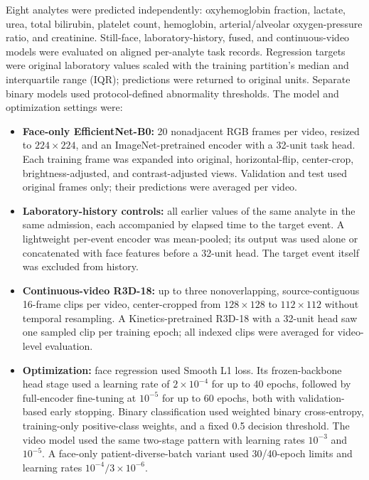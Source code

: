 \documentclass[10pt,a4paper]{article}
\begin{document}
Eight analytes were predicted independently: oxyhemoglobin fraction, lactate, urea, total bilirubin, platelet count, hemoglobin, arterial/alveolar oxygen-pressure ratio, and creatinine. Still-face, laboratory-history, fused, and continuous-video models were evaluated on aligned per-analyte task records. Regression targets were original laboratory values scaled with the training partition's median and interquartile range (IQR); predictions were returned to original units. Separate binary models used protocol-defined abnormality thresholds. The model and optimization settings were:
\begin{itemize}
\setlength{\itemsep}{1pt}
\item \textbf{Face-only EfficientNet-B0:} 20 nonadjacent RGB frames per video, resized to $224\times224$, and an ImageNet-pretrained encoder with a 32-unit task head. Each training frame was expanded into original, horizontal-flip, center-crop, brightness-adjusted, and contrast-adjusted views. Validation and test used original frames only; their predictions were averaged per video.
\item \textbf{Laboratory-history controls:} all earlier values of the same analyte in the same admission, each accompanied by elapsed time to the target event. A lightweight per-event encoder was mean-pooled; its output was used alone or concatenated with face features before a 32-unit head. The target event itself was excluded from history.
\item \textbf{Continuous-video R3D-18:} up to three nonoverlapping, source-contiguous 16-frame clips per video, center-cropped from $128\times128$ to $112\times112$ without temporal resampling. A Kinetics-pretrained R3D-18 with a 32-unit head saw one sampled clip per training epoch; all indexed clips were averaged for video-level evaluation.
\item \textbf{Optimization:} face regression used Smooth L1 loss. Its frozen-backbone head stage used a learning rate of $2\times10^{-4}$ for up to 40 epochs, followed by full-encoder fine-tuning at $10^{-5}$ for up to 60 epochs, both with validation-based early stopping. Binary classification used weighted binary cross-entropy, training-only positive-class weights, and a fixed 0.5 decision threshold. The video model used the same two-stage pattern with learning rates $10^{-3}$ and $10^{-5}$. A face-only patient-diverse-batch variant used 30/40-epoch limits and learning rates $10^{-4}/3\times10^{-6}$.
\end{itemize}
\end{document}
